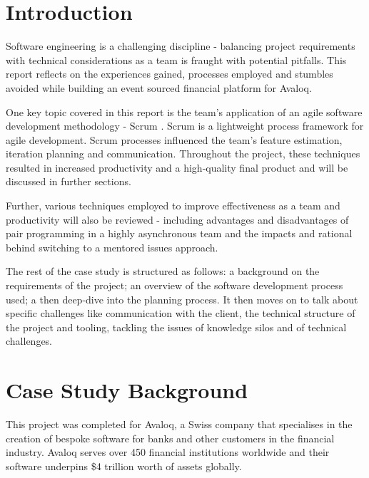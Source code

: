 \documentclass{l3proj}
\begin{document}
\section{Introduction}
\label{sec:introduction}
Software engineering is a challenging discipline - balancing project requirements with technical considerations as a team is fraught with potential pitfalls. This report reflects on the experiences gained, processes employed and stumbles avoided while building an event sourced financial platform for Avaloq.

One key topic covered in this report is the team's application of an agile software development methodology - Scrum \cite{scrum}. Scrum is a lightweight process framework for agile development. Scrum processes influenced the team's feature estimation, iteration planning and communication. Throughout the project, these techniques resulted in increased productivity and a high-quality final product and will be discussed in further sections.

Further, various techniques employed to improve effectiveness as a team and productivity will also be reviewed - including advantages and disadvantages of pair programming in a highly asynchronous team and the impacts and rational behind switching to a mentored issues approach.

The rest of the case study is structured as follows: a background on the requirements of the project; an overview of the software development process used; a then deep-dive into the planning process. It then moves on to talk about specific challenges like communication with the client, the technical structure of the project and tooling, tackling the issues of knowledge silos and of technical challenges.

\section{Case Study Background}
\label{sec:background}
This project was completed for Avaloq, a Swiss company that specialises in the creation of bespoke software for banks and other customers in the financial industry. Avaloq serves over 450 financial institutions worldwide and their software underpins \$4 trillion worth of assets globally.
\end{document}
